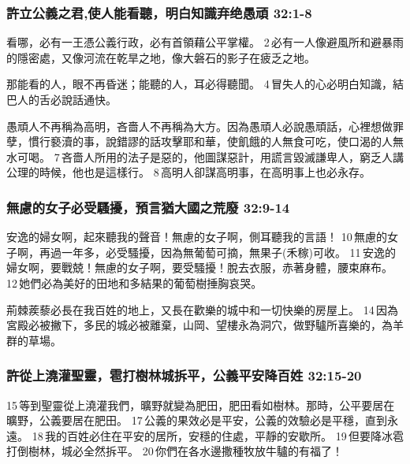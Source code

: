 \subsubsection{許立公義之君,使人能看聽，明白知識弃绝愚頑 32:1-8}
看哪，必有一王憑公義行政，必有首領藉公平掌權。 2 必有一人像避風所和避暴雨的隱密處，又像河流在乾旱之地，像大磐石的影子在疲乏之地。 

那能看的人，眼不再昏迷；能聽的人，耳必得聽聞。 4 冒失人的心必明白知識，結巴人的舌必說話通快。

愚頑人不再稱為高明，吝嗇人不再稱為大方。因為愚頑人必說愚頑話，心裡想做罪孽，慣行褻瀆的事，說錯謬的話攻擊耶和華，使飢餓的人無食可吃，使口渴的人無水可喝。 7 吝嗇人所用的法子是惡的，他圖謀惡計，用謊言毀滅謙卑人，窮乏人講公理的時候，他也是這樣行。 8 高明人卻謀高明事，在高明事上也必永存。

\subsubsection{無慮的女子必受騷擾，預言猶大國之荒廢 32:9-14}
安逸的婦女啊，起來聽我的聲音！無慮的女子啊，側耳聽我的言語！ 10 無慮的女子啊，再過一年多，必受騷擾，因為無葡萄可摘，無果子(禾稼)可收。 11 安逸的婦女啊，要戰兢！無慮的女子啊，要受騷擾！脫去衣服，赤著身體，腰束麻布。 12 她們必為美好的田地和多結果的葡萄樹捶胸哀哭。

荊棘蒺藜必長在我百姓的地上，又長在歡樂的城中和一切快樂的房屋上。 14 因為宮殿必被撇下，多民的城必被離棄，山岡、望樓永為洞穴，做野驢所喜樂的，為羊群的草場。 

\subsubsection{許從上澆灌聖靈，雹打樹林城拆平，公義平安降百姓 32:15-20}
15 等到聖靈從上澆灌我們，曠野就變為肥田，肥田看如樹林。那時，公平要居在曠野，公義要居在肥田。 17 公義的果效必是平安，公義的效驗必是平穩，直到永遠。 18 我的百姓必住在平安的居所，安穩的住處，平靜的安歇所。 19 但要降冰雹打倒樹林，城必全然拆平。 20 你們在各水邊撒種牧放牛驢的有福了！


